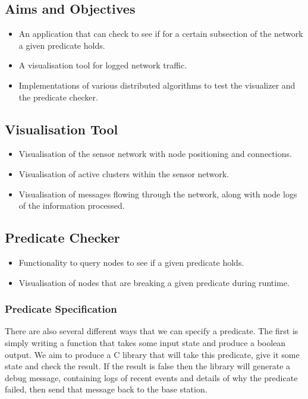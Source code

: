\documentclass[a4paper]{article}
\begin{document}
\subsection{Aims and Objectives}
\begin{itemize}
	\item An application that can check to see if for a certain subsection
of the network a given predicate holds.
	\item A visualisation tool for logged network traffic.
	\item Implementations of various distributed algorithms to test the
visualizer and the predicate checker.
\end{itemize}

\subsection{Visualisation Tool}
\begin{itemize}
	\item Visualisation of the sensor network with node positioning and
connections.
	\item Visualisation of active clusters within the sensor network.
	\item Visualisation of messages flowing through the network, along with
node logs of the information processed.
\end{itemize}

\subsection{Predicate Checker}
\begin{itemize}
	\item Functionality to query nodes to see if a given predicate holds.
	\item Visualisation of nodes that are breaking a given predicate during
runtime.
\end{itemize}

\subsubsection{Predicate Specification}

There are also several different ways that we can specify a predicate. The first
is simply writing a function that takes some input state and produce a boolean
output. We aim to produce a C library that will take this predicate, give it
some state and check the result. If the result is false then the library will
generate a debug message, containing logs of recent events and details of why
the predicate failed, then send that message back to the base station.
\end{document}
